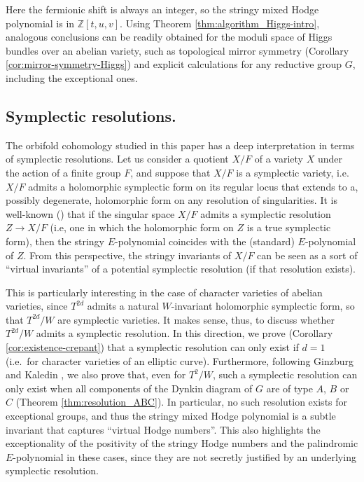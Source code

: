 \documentclass[11pt,english]{amsart}
\numberwithin{equation}{section}
\numberwithin{figure}{section}
\theoremstyle{plain}
\theoremstyle{plain}
\theoremstyle{definition}
\theoremstyle{remark}
\newcommand{\ZZ}{\mathbb{Z}}
\begin{document}
Here the fermionic shift is always an integer, so the stringy mixed Hodge polynomial is in $\ZZ[t,u,v]$. Using Theorem \ref{thm:algorithm_Higgs-intro}, analogous conclusions can be readily obtained for the moduli space of Higgs bundles over an abelian variety, such as topological mirror symmetry (Corollary \ref{cor:mirror-symmetry-Higgs}) and explicit calculations for any reductive group $G$, including the exceptional ones.

\subsection*{Symplectic resolutions.} The orbifold cohomology studied in this paper has a deep interpretation in terms of symplectic resolutions. Let us consider a quotient $X/F$ of a variety $X$ under the action of a finite group $F$, and suppose that $X/F$ is a symplectic variety, i.e. $X/F$ admits a holomorphic symplectic form on its regular locus that extends to a, possibly degenerate, holomorphic form on any resolution of singularities. It is well-known (\cite[Theorem 3.12]{Ba}) that if the singular space $X/F$ admits a symplectic resolution $Z \to X/F$ (i.e, one in which the holomorphic form on $Z$ is a true symplectic form), then the stringy $E$-polynomial coincides with the (standard) $E$-polynomial of $Z$. From this perspective, the stringy invariants of $X/F$ can be seen as a sort of ``virtual invariants'' of a potential symplectic resolution (if that resolution exists).

This is particularly interesting in the case of character varieties of abelian varieties, since $T^{2d}$ admits a natural $W$-invariant holomorphic symplectic form, so that $T^{2d}/W$ are symplectic varieties. It makes sense, thus, to discuss whether $T^{2d}/W$ admits a symplectic resolution. In this direction, we prove (Corollary \ref{cor:existence-crepant}) that a symplectic resolution can only exist if $d = 1$ (i.e.\ for character varieties of an elliptic curve). Furthermore, following Ginzburg and Kaledin \cite{GK04}, we also prove that, even for $T^2/W$, such a symplectic resolution can only exist when all components of the Dynkin diagram of $G$ are of type $A$, $B$ or $C$ (Theorem \ref{thm:resolution_ABC}). In particular, no such resolution exists for exceptional groups, and thus the stringy mixed Hodge polynomial is a subtle invariant that captures ``virtual Hodge numbers''. This also highlights the exceptionality of the positivity of the stringy Hodge numbers and the palindromic $E$-polynomial in these cases, since they are not secretly justified by an underlying symplectic resolution. 
\end{document}
